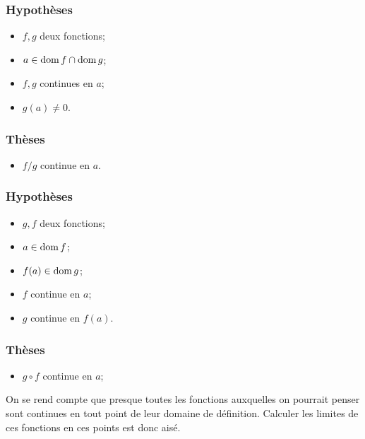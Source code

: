 \documentclass[main.tex]{subfiles}
\begin{document}
\begin{proposition}

    \subsubsection*{Hypothèses}
    \begin{itemize}
        \item $f, g$ deux fonctions;
        \item $a \in \operatorname{dom} f \cap \operatorname{dom} g$;
        \item $f ,g$ continues en $a$;
        \item $g(a) \ne 0$.
    \end{itemize}

    \subsubsection*{Thèses}
    \begin{itemize}
        \item $f/g$ continue en $a$.
    \end{itemize}
\end{proposition}

\begin{proposition}

    \subsubsection*{Hypothèses}
    \begin{itemize}
        \item $g, f$ deux fonctions;
        \item $a \in \operatorname{dom} f$;
        \item $f(a) \in \operatorname{dom} g$;
        \item $f$ continue en $a$;
        \item $g$ continue en $f(a)$.
    \end{itemize}

    \subsubsection*{Thèses}
    \begin{itemize}
        \item $g \circ f$ continue en $a$;
    \end{itemize}
\end{proposition}

On se rend compte que presque toutes les fonctions auxquelles on pourrait penser sont continues en tout point de leur domaine de définition.
Calculer les limites de ces fonctions en ces points est donc aisé.
\end{document}

